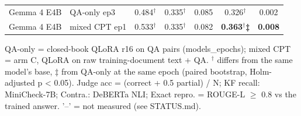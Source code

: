 \begin{table}[t]
{\begin{tabular}{llccccc}
Gemma 4 E4B & QA-only ep3 & 0.484$^\dagger$ & 0.335$^\dagger$ & 0.085 & 0.326$^\dagger$ & 0.002 \\
Gemma 4 E4B & mixed CPT ep1 & 0.533$^\dagger$ & 0.335$^\dagger$ & 0.082 & \textbf{0.363$^\dagger$‡} & \textbf{0.008} \\
\bottomrule
\end{tabular}}
\par\smallskip\footnotesize QA-only = closed-book QLoRA r16 on QA pairs (models\_epochs); mixed CPT = arm C, QLoRA on raw training-document text + QA. $^\dagger$ differs from the same model's base, ‡ from QA-only at the same epoch (paired bootstrap, Holm-adjusted p < 0.05). Judge acc = (correct + 0.5 partial) / N; KF recall: MiniCheck-7B; Contra.: DeBERTa NLI; Exact repro. = ROUGE-L $\geq$ 0.8 vs the trained answer. '–' = not measured (see STATUS.md).
\end{table}

